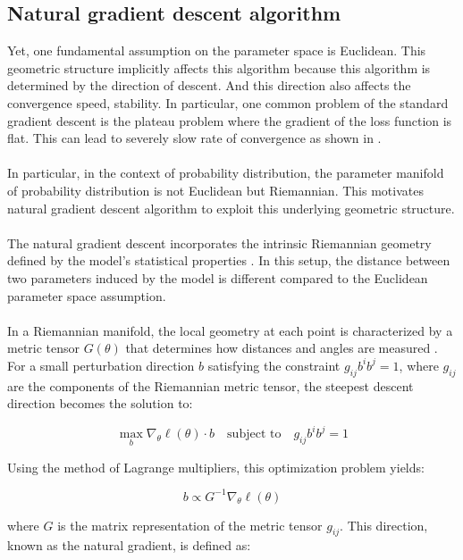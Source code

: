 \documentclass[a4paper]{article}
\begin{document}
\subsection{Natural gradient descent algorithm}
Yet, one fundamental assumption on the parameter space is Euclidean. This geometric structure implicitly affects this algorithm because this algorithm is determined by the direction of descent. And this direction also affects the convergence speed, stability. In particular, one common problem of the standard gradient descent is the plateau problem where the gradient of the loss function is flat. This can lead to severely slow rate of convergence as shown in \cite{amari2016information}.\\
\\
In particular, in the context of probability distribution, the parameter manifold of probability distribution is not Euclidean but Riemannian. This motivates natural gradient descent algorithm to exploit this underlying geometric structure.\\
\\
The natural gradient descent incorporates the intrinsic Riemannian geometry defined by the model's statistical properties \cite{amari1998natural}. In this setup, the distance between two parameters induced by the model is different compared to the Euclidean parameter space assumption. \\
\\
In a Riemannian manifold, the local geometry at each point is characterized by a metric tensor $G(\theta)$ that determines how distances and angles are measured \cite{amari2016information}. For a small perturbation direction $b$ satisfying the constraint $g_{ij}b^i b^j = 1$, where $g_{ij}$ are the components of the Riemannian metric tensor, the steepest descent direction becomes the solution to:

\begin{equation}
\max_b \nabla_\theta \ell(\theta) \cdot b \quad \text{subject to} \quad g_{ij}b^i b^j = 1
\end{equation}

Using the method of Lagrange multipliers, this optimization problem yields:

\begin{equation}
b \propto G^{-1}\nabla_{\theta} \ell(\theta)
\end{equation}

where $G$ is the matrix representation of the metric tensor $g_{ij}$. This direction, known as the natural gradient, is defined as:
\end{document}
